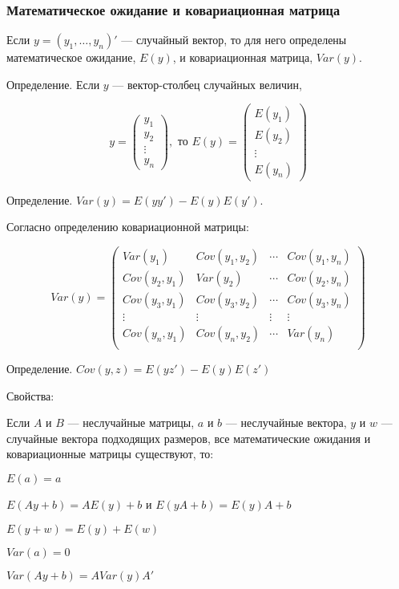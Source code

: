 \documentclass[]{article}
\begin{document}
\subsubsection{Математическое ожидание и ковариационная
матрица}\label{----}

Если $y=(y_1, \ldots, y_n)'$ --- случайный вектор, то для него
определены математическое ожидание, $E(y)$, и ковариационная матрица,
$Var(y)$.

Определение. Если $y$ --- вектор-столбец случайных величин,

\[
y=
\begin{pmatrix}
y_1 \\
y_2 \\
\vdots \\
y_n
\end{pmatrix}
,
\text{ то }
E(y)=
\begin{pmatrix}
E(y_1) \\
E(y_2) \\
\vdots \\
E(y_n)
\end{pmatrix}
\]

Определение. $Var(y)=E(yy')-E(y)E(y')$.

Согласно определению ковариационной матрицы:

\[
Var(y) = \begin{pmatrix}
Var(y_1) & Cov(y_1,y_2) & \cdots & Cov(y_1,y_n) \\
Cov(y_2,y_1) & Var(y_2) & \cdots & Cov(y_2,y_n) \\
Cov(y_3,y_1) & Cov(y_3,y_2) & \cdots & Cov(y_3,y_n) \\
\vdots & \vdots & \vdots & \vdots \\
Cov(y_n,y_1) & Cov(y_n,y_2) & \cdots & Var(y_n) \\
\end{pmatrix}
\]

Определение. $Cov(y,z)=E(yz')-E(y)E(z')$

Свойства:

Если $A$ и $B$ --- неслучайные матрицы, $a$ и $b$ --- неслучайные
вектора, $y$ и $w$ --- случайные вектора подходящих размеров, все
математические ожидания и ковариационные матрицы существуют, то:

$E(a)=a$

$E(Ay+b)=AE(y)+b$ и $E(yA+b)=E(y)A+b$

$E(y+w)=E(y)+E(w)$

$Var(a)=0$

$Var(Ay+b)=AVar(y)A'$
\end{document}
